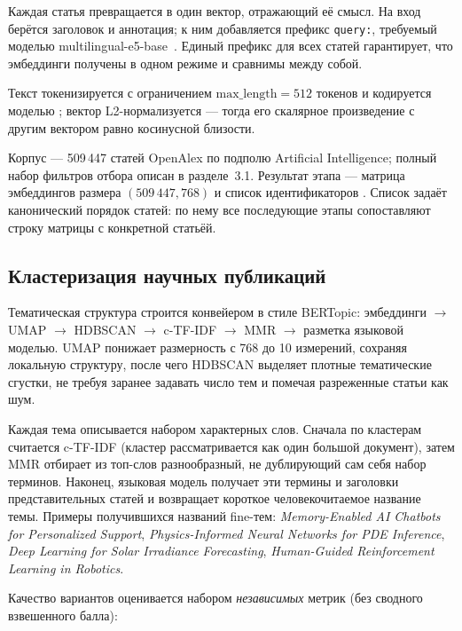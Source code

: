Каждая статья превращается в один вектор, отражающий её смысл. На вход берётся заголовок и
аннотация; к ним добавляется префикс \texttt{query:}, требуемый моделью
multilingual-e5-base~\cite{wang2024multilinguale5}. Единый префикс для всех статей гарантирует,
что эмбеддинги получены в одном режиме и сравнимы между собой.

Текст токенизируется с ограничением $\mathrm{max\_length} = 512$ токенов и кодируется моделью
; вектор L2-нормализуется — тогда его скалярное произведение
с другим вектором равно косинусной близости.

Корпус — 509\,447 статей OpenAlex по подполю Artificial Intelligence; полный набор фильтров
отбора описан в разделе~3.1. Результат этапа — матрица эмбеддингов 
размера $(509\,447, 768)$ и список идентификаторов . Список задаёт канонический
порядок статей: по нему все последующие этапы сопоставляют строку матрицы с конкретной статьёй.

\subsection{Кластеризация научных публикаций}
\label{sec:cluster}

Тематическая структура строится конвейером в стиле BERTopic: эмбеддинги $\to$ UMAP $\to$ HDBSCAN
$\to$ c-TF-IDF $\to$ MMR $\to$ разметка языковой моделью. UMAP понижает размерность с 768 до
10 измерений, сохраняя локальную структуру, после чего HDBSCAN выделяет плотные
тематические сгустки, не требуя заранее задавать число тем и помечая разреженные статьи как шум.

Каждая тема описывается набором характерных слов. Сначала по кластерам считается c-TF-IDF (кластер
рассматривается как один большой документ), затем MMR отбирает из топ-слов разнообразный, не
дублирующий сам себя набор терминов. Наконец, языковая модель получает эти термины и заголовки
представительных статей и возвращает короткое человекочитаемое название темы. Примеры получившихся
названий fine-тем: \emph{Memory-Enabled AI Chatbots for Personalized Support},
\emph{Physics-Informed Neural Networks for PDE Inference},
\emph{Deep Learning for Solar Irradiance Forecasting},
\emph{Human-Guided Reinforcement Learning in Robotics}.

Качество вариантов оценивается набором \emph{независимых} метрик (без сводного взвешенного балла):

